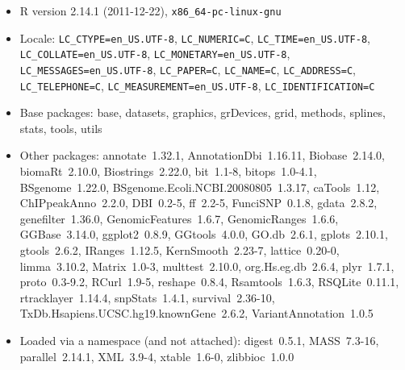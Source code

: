 \documentclass[12pt,fullpage]{article}
\begin{document}
\begin{itemize}\raggedright
  \item R version 2.14.1 (2011-12-22), \verb|x86_64-pc-linux-gnu|
  \item Locale: \verb|LC_CTYPE=en_US.UTF-8|, \verb|LC_NUMERIC=C|, \verb|LC_TIME=en_US.UTF-8|, \verb|LC_COLLATE=en_US.UTF-8|, \verb|LC_MONETARY=en_US.UTF-8|, \verb|LC_MESSAGES=en_US.UTF-8|, \verb|LC_PAPER=C|, \verb|LC_NAME=C|, \verb|LC_ADDRESS=C|, \verb|LC_TELEPHONE=C|, \verb|LC_MEASUREMENT=en_US.UTF-8|, \verb|LC_IDENTIFICATION=C|
  \item Base packages: base, datasets, graphics, grDevices, grid,
    methods, splines, stats, tools, utils
  \item Other packages: annotate~1.32.1, AnnotationDbi~1.16.11,
    Biobase~2.14.0, biomaRt~2.10.0, Biostrings~2.22.0, bit~1.1-8,
    bitops~1.0-4.1, BSgenome~1.22.0,
    BSgenome.Ecoli.NCBI.20080805~1.3.17, caTools~1.12,
    ChIPpeakAnno~2.2.0, DBI~0.2-5, ff~2.2-5, FunciSNP~0.1.8,
    gdata~2.8.2, genefilter~1.36.0, GenomicFeatures~1.6.7,
    GenomicRanges~1.6.6, GGBase~3.14.0, ggplot2~0.8.9, GGtools~4.0.0,
    GO.db~2.6.1, gplots~2.10.1, gtools~2.6.2, IRanges~1.12.5,
    KernSmooth~2.23-7, lattice~0.20-0, limma~3.10.2, Matrix~1.0-3,
    multtest~2.10.0, org.Hs.eg.db~2.6.4, plyr~1.7.1, proto~0.3-9.2,
    RCurl~1.9-5, reshape~0.8.4, Rsamtools~1.6.3, RSQLite~0.11.1,
    rtracklayer~1.14.4, snpStats~1.4.1, survival~2.36-10,
    TxDb.Hsapiens.UCSC.hg19.knownGene~2.6.2, VariantAnnotation~1.0.5
  \item Loaded via a namespace (and not attached): digest~0.5.1,
    MASS~7.3-16, parallel~2.14.1, XML~3.9-4, xtable~1.6-0,
    zlibbioc~1.0.0
\end{itemize}
\end{document}

